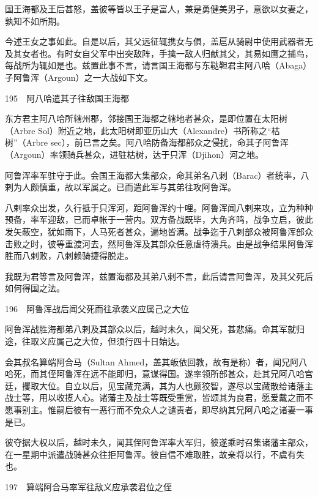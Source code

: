 \documentclass[12pt,UTF8]{ctexbook}
\begin{document}
国王海都及王后甚怒，盖彼等皆以王子是富人，兼是勇健美男子，意欲以女妻之，孰知不如所期。

今述王女之事如此。自是以后，其父远征辄携女与俱，盖扈从骑尉中使用武器者无及其女者也。有时女自父军中出突敌阵，手擒一敌人归献其父，其易如鹰之捕鸟，每战所为辄如是也。兹置此事不言，请言国王海都与东鞑靼君主阿八哈（Abaga）子阿鲁浑（Argoun）之一大战如下文。





195　阿八哈遣其子往敌国王海都

东方君主阿八哈所辖州郡，邻接国王海都之辖地者甚众，是即位置在太阳树（Arbre Sol）附近之地，此太阳树即亚历山大（Alexandre）书所称之“枯树”（Arbre sec），前已言之矣。阿八哈防备海都部众之侵扰，命其子阿鲁浑（Argoun）率领骑兵甚众，进驻枯树，达于只浑（Djihon）河之地。

阿鲁浑率军驻守于此。会国王海都大集部众，命其弟名八剌（Barac）者统率，八剌为人颇慎重，故以军属之。已而遣此军与其弟往攻阿鲁浑。

八剌率众出发，久行抵于只浑河，距阿鲁浑约十哩。阿鲁浑闻八剌来攻，立为种种预备，率军迎敌，已而卓帐于一营内。双方备战既毕，大角齐鸣，战争立启，彼此发矢蔽空，犹如雨下，人马死者甚众，遍地皆满。战争迄于八剌部众被阿鲁浑部众击败之时，彼等重渡河去，然阿鲁浑及其部众任意虐待溃兵。由是战争结果阿鲁浑胜而八剌败，八剌赖骑捷得脱走。

我既为君等言及阿鲁浑，兹置海都及其弟八剌不言，此后请言阿鲁浑，及其父死后如何得国之法。





196　阿鲁浑战后闻父死而往承袭义应属己之大位

阿鲁浑战胜海都弟八剌及其部众以后，越时未久，闻父死，甚悲痛。命其军就归途，往取义应属己之大位，但须行四十日始达。

会其叔名算端阿合马（Sultan Ahmed，盖其皈依回教，故有是称）者，闻兄阿八哈死，而其侄阿鲁浑在远不能即归，意谋得国。遂率领所部甚众，赴其兄阿八哈宫廷，攫取大位。自立以后，见宝藏充满，其为人也颇狡智，遂尽以宝藏散给诸藩主战士等，用以收揽人心。诸藩主及战士等既受重赏，皆颂其为良君，愿爱戴之而不愿事别主。惟嗣后彼有一恶行而不免众人之谴责者，即尽纳其兄阿八哈之诸妻一事是已。

彼夺据大权以后，越时未久，闻其侄阿鲁浑率大军归，彼遂乘时召集诸藩主部众，在一星期中派遣战骑甚众往拒阿鲁浑。彼自信不难取胜，故亲将以行，不虞有失也。





197　算端阿合马率军往敌义应承袭君位之侄
\end{document}
